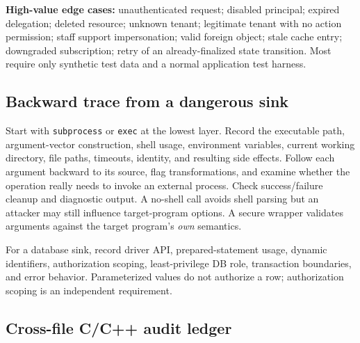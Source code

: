 \documentclass[
  letterpaper,
]{article}
\begin{document}
\textbf{High-value edge cases:} unauthenticated request; disabled
principal; expired delegation; deleted resource; unknown tenant;
legitimate tenant with no action permission; staff support
impersonation; valid foreign object; stale cache entry; downgraded
subscription; retry of an already-finalized state transition. Most
require only synthetic test data and a normal application test harness.

\subsection{Backward trace from a dangerous
sink}\label{backward-trace-from-a-dangerous-sink}

Start with \texttt{subprocess} or \texttt{exec} at the lowest layer.
Record the executable path, argument-vector construction, shell usage,
environment variables, current working directory, file paths, timeouts,
identity, and resulting side effects. Follow each argument backward to
its source, flag transformations, and examine whether the operation
really needs to invoke an external process. Check success/failure
cleanup and diagnostic output. A no-shell call avoids shell parsing but
an attacker may still influence target-program options. A secure wrapper
validates arguments against the target program's \emph{own} semantics.

For a database sink, record driver API, prepared-statement usage,
dynamic identifiers, authorization scoping, least-privilege DB role,
transaction boundaries, and error behavior. Parameterized values do not
authorize a row; authorization scoping is an independent requirement.

\subsection{Cross-file C/C++ audit
ledger}\label{cross-file-cc-audit-ledger}
\end{document}
